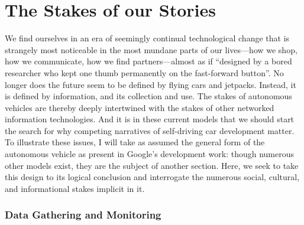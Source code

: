 \chapter{The Stakes of our Stories}
\label{chap:3}









We find ourselves in an era of seemingly continual technological
change that is strangely most noticeable in the most mundane parts of
our lives---how we shop, how we communicate, how we find
partners---almost as if ``designed by a bored researcher who kept one
thumb permanently on the fast-forward button''\cite[p.
  7]{Neuromancer1984}. No longer does the future seem to be
defined by flying cars and jetpacks. Instead, it is defined by
information, and its collection and use. The stakes of autonomous
vehicles are thereby deeply intertwined with the
stakes of other networked information technologies. And it is in these
current models that we should start the search for why competing
narratives of self-driving car development matter. To illustrate these
issues, I will
take as assumed the general form of the autonomous vehicle as present
in Google's development work: though numerous other models exist, they
are the subject of another section. Here, we seek to take this design
to its logical conclusion and interrogate the numerous social,
cultural, and informational stakes implicit in it.


\subsection{Data Gathering and Monitoring} 

